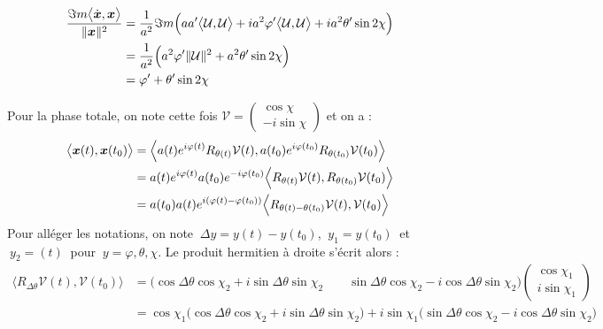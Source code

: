 \begin{annexe}
\begin{demo}
	\begin{align*}
		\frac{\Im m\big\langle \dot{\boldsymbol{x}}, \boldsymbol{x}\big\rangle}{\|\boldsymbol{x}\|^2} &= \frac{1}{a^2}\Im m\Big(aa' \big\langle \mathcal{U}, \mathcal{U}\big\rangle  + ia^2\varphi' \big\langle \mathcal{U}, \mathcal{U}\big\rangle + ia^2\theta' \sin2\chi \Big) \\
		&= \frac{1}{a^2} \Big( a^2\varphi' \|\mathcal{U}\|^2 + a^2\theta' \sin2\chi \Big) \\
		&= \varphi' + \theta' \sin2\chi
	\end{align*}
\end{demo}

\begin{demo}
	Pour la phase totale, on note cette fois $\mathcal{V} = \begin{pmatrix} \cos\chi \\ -i\sin\chi \end{pmatrix}$ et on a :
	\begin{align*}
		\big\langle \boldsymbol{x}(t), \boldsymbol{x}(t_0)\big\rangle &= \Big\langle a(t)e^{i\varphi(t)}R_{\theta(t)}\mathcal{V}(t), a(t_0)e^{i\varphi(t_0)}R_{\theta(t_0)}\mathcal{V}(t_0) \Big\rangle \\
		&= a(t)e^{i\varphi(t)} a(t_0)e^{-i\varphi(t_0)} \Big\langle R_{\theta(t)}\mathcal{V}(t), R_{\theta(t_0)}\mathcal{V}(t_0) \Big\rangle \\
		&= a(t_0)a(t)e^{i(\varphi(t)-\varphi(t_0))}\Big\langle R_{\theta(t)- \theta(t_0)}\mathcal{V}(t), \mathcal{V}(t_0) \Big\rangle
	\end{align*}
	Pour alléger les notations, on note $\ \Delta y =y(t)-y(t_0)$, $\ y_1=y(t_0)\ $ et $\ y_2=(t)\ $ pour $\ y=\varphi,\theta,\chi$. Le produit hermitien à droite s'écrit alors :
	\begin{align*}
		\Big\langle R_{\Delta\theta}\mathcal{V}(t), \mathcal{V}(t_0) \Big\rangle &=   \Big(\cos\Delta\theta \cos\chi_2 + i\sin\Delta\theta \sin\chi_2 \qquad \sin\Delta\theta \cos\chi_2 - i\cos\Delta\theta \sin\chi_2\Big) \begin{pmatrix} \cos\chi_1 \\ i\sin\chi_1 \end{pmatrix} \\
		&= \cos\chi_1\Big(\cos\Delta\theta \cos\chi_2 + i\sin\Delta\theta \sin\chi_2\Big) + i\sin\chi_1\Big(\sin\Delta\theta \cos\chi_2 - i\cos\Delta\theta \sin\chi_2\Big) \\

\end{align*}
\end{demo}
\end{annexe}
